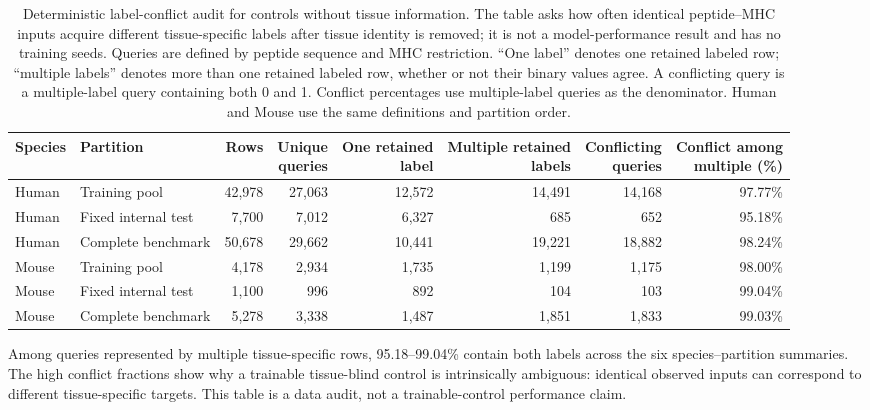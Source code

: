 \begin{table}[t]
\centering
\caption{Deterministic label-conflict audit for controls without tissue information. The table asks how often identical peptide--MHC inputs acquire different tissue-specific labels after tissue identity is removed; it is not a model-performance result and has no training seeds. Queries are defined by peptide sequence and MHC restriction. ``One label'' denotes one retained labeled row; ``multiple labels'' denotes more than one retained labeled row, whether or not their binary values agree. A conflicting query is a multiple-label query containing both 0 and 1. Conflict percentages use multiple-label queries as the denominator. Human and Mouse use the same definitions and partition order.}
\label{tab:tissue-blind-conflict-audit}
\fontsize{7.2}{8.2}\selectfont
\setlength{\tabcolsep}{2.5pt}
\begin{tabularx}{\textwidth}{@{}l>{\raggedright\arraybackslash}Xrrrrrr@{}}
\toprule
Species & Partition & Rows & \shortstack{Unique\\queries} & \shortstack{One retained\\label} & \shortstack{Multiple retained\\labels} & \shortstack{Conflicting\\queries} & \shortstack{Conflict among\\multiple (\%)} \\
\midrule
Human & Training pool & 42,978 & 27,063 & 12,572 & 14,491 & 14,168 & 97.77\% \\
Human & Fixed internal test & 7,700 & 7,012 & 6,327 & 685 & 652 & 95.18\% \\
Human & Complete benchmark & 50,678 & 29,662 & 10,441 & 19,221 & 18,882 & 98.24\% \\
\midrule
Mouse & Training pool & 4,178 & 2,934 & 1,735 & 1,199 & 1,175 & 98.00\% \\
Mouse & Fixed internal test & 1,100 & 996 & 892 & 104 & 103 & 99.04\% \\
Mouse & Complete benchmark & 5,278 & 3,338 & 1,487 & 1,851 & 1,833 & 99.03\% \\
\bottomrule
\end{tabularx}
\end{table}

Among queries represented by multiple tissue-specific rows, 95.18--99.04\% contain both labels across the six species--partition summaries. The high conflict fractions show why a trainable tissue-blind control is intrinsically ambiguous: identical observed inputs can correspond to different tissue-specific targets. This table is a data audit, not a trainable-control performance claim.

